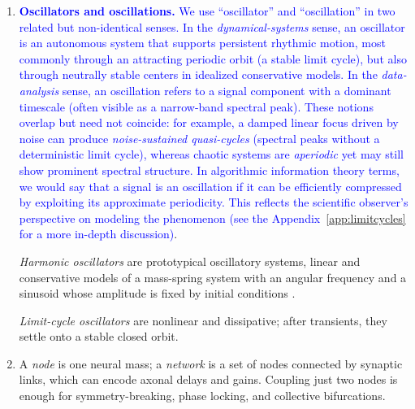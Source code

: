 \documentclass[12pt]{article}
\numberwithin{equation}{section}
\newcommand{\rev}[1]{\textcolor{blue}{#1}}
\begin{document}
\begin{enumerate}
\begin{enumerate}
\item 
\rev{\textbf{Oscillators and oscillations.}
We use ``oscillator'' and ``oscillation'' in two related but non-identical senses.
In the \emph{dynamical-systems} sense, an oscillator is an autonomous system that supports
persistent rhythmic motion, most commonly through an attracting periodic orbit (a stable
limit cycle), but also through neutrally stable centers in idealized conservative models.
In the \emph{data-analysis} sense, an oscillation refers to a signal component with a
dominant timescale (often visible as a narrow-band spectral peak).
These notions overlap but need not coincide: for example, a damped linear focus driven by
noise can produce \emph{noise-sustained quasi-cycles} (spectral peaks without a deterministic
limit cycle), whereas chaotic systems are \emph{aperiodic} yet may still show prominent
spectral structure.
In algorithmic information theory terms, we would say that a signal is an oscillation if it can be efficiently compressed by exploiting its approximate periodicity. This reflects the scientific observer's perspective on modeling the phenomenon (see the Appendix~\ref{app:limitcycles} for a more in-depth discussion)}.


\emph{Harmonic oscillators} are prototypical oscillatory systems,  linear and conservative models of   a mass-spring system with an angular frequency and a sinusoid whose amplitude is fixed by initial conditions \cite{Strogatz1994}. 

\emph{Limit-cycle oscillators} are nonlinear and dissipative; after transients, they settle onto a stable closed orbit.


\item 
A \emph{node} is one neural mass; a \emph{network} is a set of nodes connected by synaptic links, which can encode axonal delays and gains.  
Coupling just two nodes is enough for symmetry-breaking, phase locking, and collective bifurcations.


\end{enumerate}
\end{enumerate}
\end{document}
